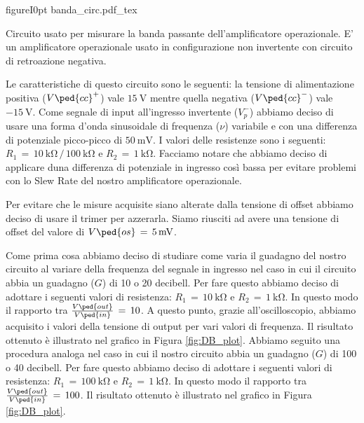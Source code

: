 \begin{wrapfloat}{figure}{I}{0pt}
        \def\svgwidth{0.48\textwidth}
        {banda_circ.pdf_tex}
        \caption{Circuito usato per misurare la banda passante dell'amplificatore operazionale. E' un amplificatore operazionale usato in configurazione non invertente con circuito di retroazione negativa.}
        \label{fig:banda_passante}
\end{wrapfloat}

Le caratteristiche di questo circuito sono le seguenti: la tensione di alimentazione positiva ($V\ped{cc}^+$) vale $\SI{+15}{\volt}$ mentre quella negativa ($V\ped{cc}^-$) vale $\SI{-15}{\volt}$. Come segnale di input all'ingresso invertente ($V_p^-$) abbiamo deciso di usare una forma d'onda sinusoidale di frequenza ($\nu$) variabile e con una differenza di potenziale picco-picco di $\SI{50}{\milli\volt}$. I valori delle resistenze sono i seguenti: $R_1\,=\,\SI{10}{\kilo\ohm}\,/\,\SI{100}{\kilo\ohm}$ e $R_2\,=\,\SI{1}{\kilo\ohm}$. Facciamo notare che abbiamo deciso di applicare duna differenza di potenziale in ingresso così bassa per evitare problemi con lo Slew Rate del nostro amplificatore operazionale.

Per evitare che le misure acquisite siano alterate dalla tensione di offset abbiamo deciso di usare il trimer per azzerarla. Siamo riusciti ad avere una tensione di offset del valore di $V\ped{os}\,=\,\SI{5}{\milli\volt}$.

Come prima cosa abbiamo deciso di studiare come varia il guadagno del nostro circuito al variare della frequenza del segnale in ingresso nel caso in cui il circuito abbia un guadagno ($G$) di 10 o 20 decibell. Per fare questo abbiamo deciso di adottare i seguenti valori di resistenza: $R_1\,=\,\SI{10}{\kilo\ohm}$ e $R_2\,=\,\SI{1}{\kilo\ohm}$. In questo modo il rapporto tra $\frac{V\ped{out}}{V\ped{in}}\,=\,10$. A questo punto, grazie all'oscilloscopio, abbiamo acquisito i valori della tensione di output per vari valori di frequenza. Il risultato ottenuto è illustrato nel grafico in Figura \ref{fig:DB_plot}.
Abbiamo seguito una procedura analoga nel caso in cui il nostro circuito abbia un guadagno ($G$) di 100 o 40 decibell. Per fare questo abbiamo deciso di adottare i seguenti valori di resistenza: $R_1\,=\,\SI{100}{\kilo\ohm}$ e $R_2\,=\,\SI{1}{\kilo\ohm}$. In questo modo il rapporto tra $\frac{V\ped{out}}{V\ped{in}}\,=\,100$. Il risultato ottenuto è illustrato nel grafico in Figura \ref{fig:DB_plot}.

